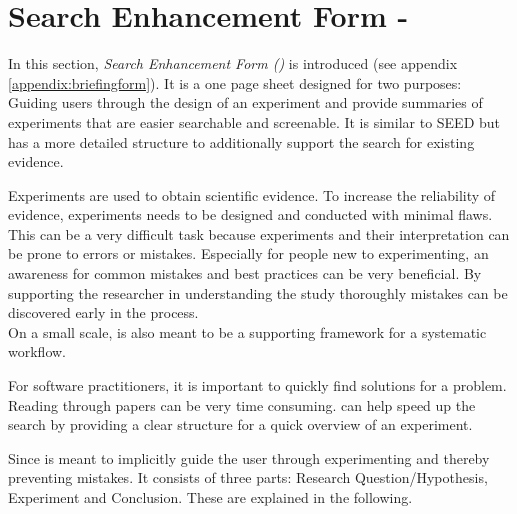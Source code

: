 
\section{Search Enhancement Form - \briefingform}
\label{sec:briefing form}

In this section, \emph{Search Enhancement Form (\briefingform{})} is introduced (see appendix \ref{appendix:briefingform}). It is a one page sheet designed for two purposes: Guiding users through the design of an experiment and provide summaries of experiments that are easier searchable and screenable. It is similar to SEED but has a more detailed structure to additionally support the search for existing evidence.

Experiments are used to obtain scientific evidence. To increase the reliability of evidence, experiments needs to be designed and conducted with minimal flaws. This can be a very difficult task because experiments and their interpretation can be prone to errors or mistakes. Especially for people new to experimenting, an awareness for common mistakes and best practices can be very beneficial. By supporting the researcher in understanding the study thoroughly mistakes can be discovered early in the process.\\
On a small scale, \briefingform{} is also meant to be a  supporting framework for a systematic workflow.

For software practitioners, it is important to quickly find solutions for a problem. Reading through papers can be very time consuming. \briefingform{} can help speed up the search by providing a clear structure for a quick overview of an experiment.

Since \briefingform{} is meant to implicitly guide the user through experimenting and thereby preventing mistakes. It consists of three parts: Research Question/Hypothesis, Experiment and Conclusion. These are explained in the following.
